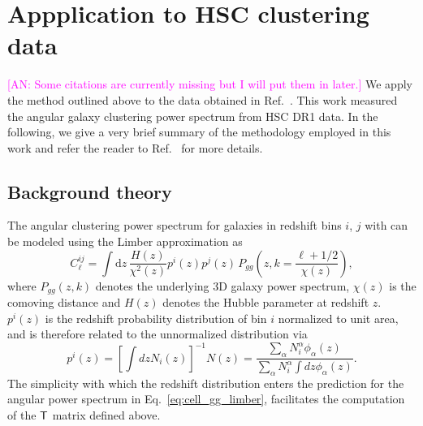 \documentclass[a4paper,11pt]{article}
\newcommand{\an}[1]{{\textcolor{magenta}{[AN: #1]}}}
\newcommand{\vN}{\mathbf{N}}
\begin{document}

  \section{Appplication to HSC clustering data}\label{sec:hsc}
    \an{Some citations are currently missing but I will put them in later.}
    We apply the method outlined above to the data obtained in Ref.~\cite{1912.08209}. This work measured the angular galaxy clustering power spectrum from HSC DR1 data. In the following, we give a very brief summary of the methodology employed in this work and refer the reader to Ref.~\cite{1912.08209} for more details.
    \subsection{Background theory}\label{ssec:hsc.theory}
      The angular clustering power spectrum for galaxies in redshift bins $i$, $j$ with can be modeled using the Limber approximation as \cite{1953ApJ...117..134L, 1992ApJ...388..272K, Kaiser:1998}
      \begin{equation}\label{eq:cell_gg_limber}
        C^{ij}_\ell = \int \mathrm{d}z\,\frac{H(z)}{\chi^2(z)} p^i(z)p^j(z)\,P_{gg}\left(z,k=\frac{\ell+1/2}{\chi(z)}\right),
      \end{equation}
    where $P_{gg}(z,k)$ denotes the underlying 3D galaxy power spectrum, $\chi(z)$ is the comoving distance and $H(z)$ denotes the Hubble parameter at redshift $z$. $p^i(z)$ is the redshift probability distribution of bin $i$ normalized to unit area, and is therefore related to the unnormalized distribution via
    \begin{equation}
      p^i(z)=\left[\int dz N_i(z)\right]^{-1}N(z)=\frac{\sum_\alpha N^\alpha_i\phi_\alpha(z)}{\sum_\alpha N^\alpha_i\int dz\phi_\alpha(z)}.
    \end{equation}
    The simplicity with which the redshift distribution enters the prediction for the angular power spectrum in Eq.~\ref{eq:cell_gg_limber}, facilitates the computation of the ${\sf T}$ matrix defined above. 
\end{document}
